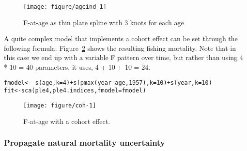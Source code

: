 \documentclass[a4paper,english,10pt]{article}\usepackage[]{graphicx}\usepackage[]{color}
\makeatletter
\def\maxwidth{ %
  \ifdim\Gin@nat@width>\linewidth
    \linewidth
  \else
    \Gin@nat@width
  \fi
}
\newcommand{\hlnum}[1]{\textcolor[rgb]{0.2,0.2,0.2}{#1}}%
\newcommand{\hlopt}[1]{\textcolor[rgb]{0.2,0.2,0.2}{#1}}%
\newcommand{\hlstd}[1]{\textcolor[rgb]{0,0,0}{#1}}%
\newcommand{\hlkwb}[1]{\textcolor[rgb]{0.361,0.506,0.596}{#1}}%
\newcommand{\hlkwc}[1]{\textcolor[rgb]{0.361,0.506,0.596}{#1}}%
\newcommand{\hlkwd}[1]{\textcolor[rgb]{0.361,0.506,0.596}{#1}}%
\newenvironment{kframe}{%
 \def\at@end@of@kframe{}%
 \ifinner\ifhmode%
  \def\at@end@of@kframe{\end{minipage}}%
  \begin{minipage}{\columnwidth}%
 \fi\fi%
 \def\FrameCommand##1{\hskip\@totalleftmargin \hskip-\fboxsep
 \colorbox{shadecolor}{##1}\hskip-\fboxsep
     \hskip-\linewidth \hskip-\@totalleftmargin \hskip\columnwidth}%
 \MakeFramed {\advance\hsize-\width
   \@totalleftmargin\z@ \linewidth\hsize
   \@setminipage}}%
 {\par\unskip\endMakeFramed%
 \at@end@of@kframe}
\newenvironment{knitrout}{}{} %
\makeatother
\begin{document}
\begin{knitrout}
\color{fgcolor}\begin{figure}[H]

{\centering \texttt{[image: figure/ageind-1]} 

}

\caption[F-at-age as thin plate spline with 3 knots for each age]{F-at-age as thin plate spline with 3 knots for each age}\label{fig:ageind}
\end{figure}


\end{knitrout}

A quite complex model that implements a cohort effect can be set through the following formula. Figure~\ref{fig:coh} shows the resulting fishing mortality. Note that in this case we end up with a variable F pattern over time, but rather than using 4 * 10 = 40 parameters, it uses, 4 + 10 + 10 = 24.

\begin{knitrout}
\color{fgcolor}\begin{kframe}
\begin{alltt}
\hlstd{fmodel} \hlkwb{<-} \hlopt{~} \hlkwd{s}\hlstd{(age,} \hlkwc{k} \hlstd{=} \hlnum{4}\hlstd{)} \hlopt{+} \hlkwd{s}\hlstd{(}\hlkwd{pmax}\hlstd{(year} \hlopt{-} \hlstd{age,} \hlnum{1957}\hlstd{),} \hlkwc{k} \hlstd{=} \hlnum{10}\hlstd{)} \hlopt{+} \hlkwd{s}\hlstd{(year,} \hlkwc{k} \hlstd{=} \hlnum{10}\hlstd{)}
\hlstd{fit} \hlkwb{<-} \hlkwd{sca}\hlstd{(ple4, ple4.indices,} \hlkwc{fmodel}\hlstd{=fmodel)}
\end{alltt}
\end{kframe}
\end{knitrout}

\begin{knitrout}
\color{fgcolor}\begin{figure}[H]

{\centering \texttt{[image: figure/coh-1]} 

}

\caption[F-at-age with a cohort effect]{F-at-age with a cohort effect.}\label{fig:coh}
\end{figure}


\end{knitrout}

\subsubsection{Propagate natural mortality uncertainty}
\end{document}
